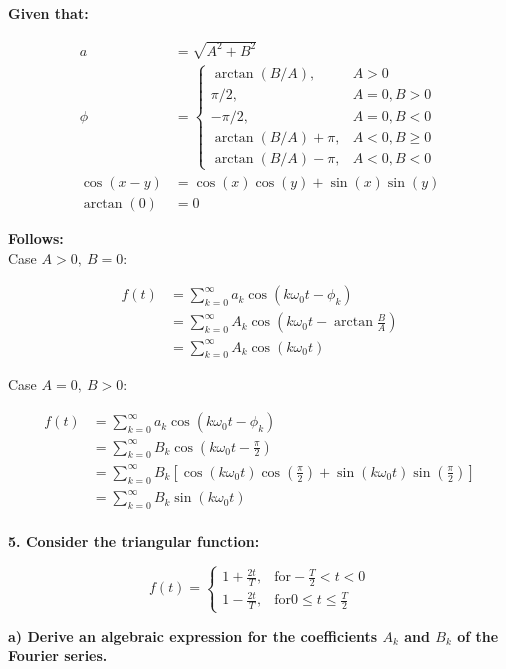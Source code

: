 \textbf{Given that:}

\begin{align}
	a &= \sqrt{A^2 + B^2} \\
	\phi &= 
	\begin{cases}
		\arctan(B/A), & A > 0\\
		\pi/2, & A=0, B>0\\
		-\pi/2, & A=0, B<0\\
		\arctan(B/A)+\pi, & A<0, B \geq 0\\
		\arctan(B/A)-\pi, & A<0, B < 0
	\end{cases}
	\\
	\cos(x-y) &= \cos(x)\cos(y) + \sin(x)\sin(y)\\
	\arctan(0) &= 0
\end{align}

\textbf{Follows:}
\\

Case $A>0,\ B=0$:

\begin{align*}
	f(t) &= \sum_{k=0}^\infty a_k \cos(k \omega_0 t - \phi_k) \\
	&= \sum_{k=0}^\infty A_k \cos\left(k \omega_0 t - \arctan{\frac{B}{A}}\right) \\
	&= \sum_{k=0}^\infty A_k \cos(k \omega_0 t) 
\end{align*}

Case $A=0,\ B>0$:

\begin{align*}
	f(t) &= \sum_{k=0}^\infty a_k \cos(k \omega_0 t - \phi_k) \\
	&= \sum_{k=0}^\infty B_k \cos\left(k \omega_0 t - \frac{\pi}{2}\right) \\
	&= \sum_{k=0}^\infty B_k \left[\cos(k \omega_0 t) \cos\left(\frac{\pi}{2}\right) + \sin(k \omega_0 t) \sin\left(\frac{\pi}{2}\right) \right]\\
	&= \sum_{k=0}^\infty B_k \sin(k \omega_0 t) 
\end{align*}
\\

\textbf{\large 5. Consider the triangular function:}

\[
	f(t) = 
	\begin{cases}
		1+\frac{2t}{T},& \text{for} - \frac{T}{2}<t<0\\
		1-\frac{2t}{T},& \text{for} 0\leq t \leq \frac{T}{2}
	\end{cases}
\]

\textbf{a) Derive an algebraic expression for the coefficients $A_k$ and $B_k$ of the Fourier series.}


